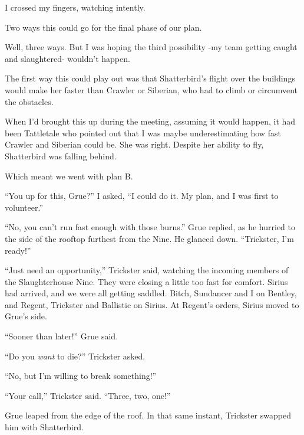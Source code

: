 I crossed my fingers, watching intently.



Two ways this could go for the final phase of our plan.



Well, three ways.  But I was hoping the third possibility -my team getting caught and slaughtered- wouldn't happen.



The first way this could play out was that Shatterbird's flight over the buildings would make her faster than Crawler or Siberian, who had to climb or circumvent the obstacles.



When I'd brought this up during the meeting, assuming it would happen, it had been Tattletale who pointed out that I was maybe underestimating how fast Crawler and Siberian could be.  She was right.  Despite her ability to fly, Shatterbird was falling behind.



Which meant we went with plan B.



``You up for this, Grue?'' I asked, ``I could do it.  My plan, and I was first to volunteer.''



``No, you can't run fast enough with those burns.'' Grue replied, as he hurried to the side of the rooftop furthest from the Nine.  He glanced down. ``Trickster, I'm ready!''



``Just need an opportunity,'' Trickster said, watching the incoming members of the Slaughterhouse Nine.  They were closing a little too fast for comfort.  Sirius had arrived, and we were all getting saddled.  Bitch, Sundancer and I on Bentley, and Regent, Trickster and Ballistic on Sirius.  At Regent's orders, Sirius moved to Grue's side.



``Sooner than later!'' Grue said.



``Do you \emph{want} to die?'' Trickster asked.



``No, but I'm willing to break something!''



``Your call,'' Trickster said.  ``Three, two, one!''



Grue leaped from the edge of the roof.  In that same instant, Trickster swapped him with Shatterbird.



